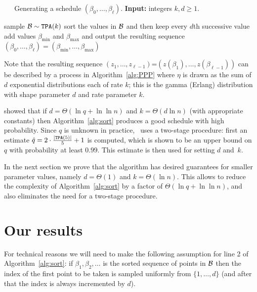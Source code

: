 \documentclass[final,12pt]{colt2018}
\def\bmin{{\beta_{\min}}}
\def\bmax{{\beta_{\max}}}
\def\calB{{\cal B}}
\begin{document}

\begin{algorithm}[h]
\caption{~~~Generating a schedule $(\beta_0,\ldots,\beta_\ell)$. {\bf Input:} integers $k,d\ge 1$.\label{alg:sort}}
\begin{algorithmic}[1]
\State sample $\calB\sim {\tt TPA}(k)$
\State sort the values in $\calB$ and then keep every $d$th successive value
\State add values $\bmin$ and $\bmax$ and output the resulting sequence $(\beta_0,\ldots,\beta_\ell)=(\bmin,\ldots,\bmax)$
\end{algorithmic}
\end{algorithm}

Note that the resulting sequence $(z_1,\ldots,z_{\ell-1})$=$(z(\beta_1),\ldots,z(\beta_{\ell-1}))$
can be described by a process in Algorithm~\ref{alg:PPP}
where $\eta$ is drawn as the sum of $d$ exponential distributions each of rate $k$;
this is the gamma (Erlang) distribution with shape parameter $d$ and rate parameter $k$.

\cite{Huber:Gibbs} showed that if $d=\Theta(\ln q+\ln\ln n)$ and $k=\Theta(d\ln n)$ (with appropriate constants)
then Algorithm~\ref{alg:sort} produces a good schedule with high probability.
Since $q$ is unknown in practice, \cite{Huber:Gibbs}~uses a two-stage procedure: first an estimate $\hat q=2\cdot{\frac{ |{\tt TPA}(5)|}5}+1$
is computed, which is shown to be an upper bound on $q$ with probability at least $0.99$. This estimate is then used for setting $d$ and~$k$.

In the next section we prove that the algorithm has desired guarantees for smaller parameter values, namely $d=\Theta(1)$ and $k=\Theta(\ln n)$.
This allows to reduce the complexity of Algorithm~\ref{alg:sort} by a factor of $\Theta(\ln q+\ln\ln n)$,
and also eliminates the need for a two-stage procedure.
















\section{Our results}\label{sec:main}
For technical reasons we will need to make the following assumption for line 2 of Algorithm~\ref{alg:sort}:
if $\beta_1,\beta_2,\ldots$ is the sorted sequence of points in $\calB$ then the index of the first point
to be taken is sampled uniformly from $\{1,\ldots,d\}$ (and after that the index is always incremented by $d$).
\end{document}
